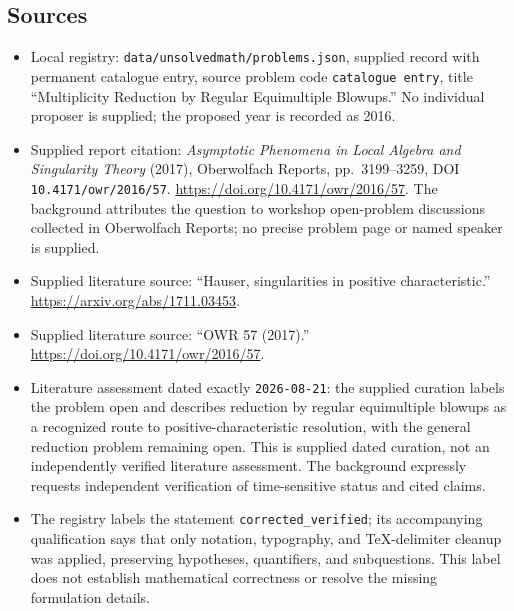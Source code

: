 \documentclass[11pt]{article}
\begin{document}
\subsection{Sources}
\begin{itemize}
\item Local registry: \texttt{data/unsolvedmath/problems.json}, supplied record with permanent catalogue entry, source problem code \texttt{catalogue entry}, title ``Multiplicity Reduction by Regular Equimultiple Blowups.'' No individual proposer is supplied; the proposed year is recorded as 2016.
\item Supplied report citation: \emph{Asymptotic Phenomena in Local Algebra and Singularity Theory} (2017), Oberwolfach Reports, pp.\ 3199--3259, DOI \texttt{10.4171/owr/2016/57}. \url{https://doi.org/10.4171/owr/2016/57}. The background attributes the question to workshop open-problem discussions collected in Oberwolfach Reports; no precise problem page or named speaker is supplied.
\item Supplied literature source: ``Hauser, singularities in positive characteristic.'' \url{https://arxiv.org/abs/1711.03453}.
\item Supplied literature source: ``OWR 57 (2017).'' \url{https://doi.org/10.4171/owr/2016/57}.
\item Literature assessment dated exactly \texttt{2026-08-21}: the supplied curation labels the problem open and describes reduction by regular equimultiple blowups as a recognized route to positive-characteristic resolution, with the general reduction problem remaining open. This is supplied dated curation, not an independently verified literature assessment. The background expressly requests independent verification of time-sensitive status and cited claims.
\item The registry labels the statement \texttt{corrected\_verified}; its accompanying qualification says that only notation, typography, and TeX-delimiter cleanup was applied, preserving hypotheses, quantifiers, and subquestions. This label does not establish mathematical correctness or resolve the missing formulation details.
\end{itemize}
\end{document}
